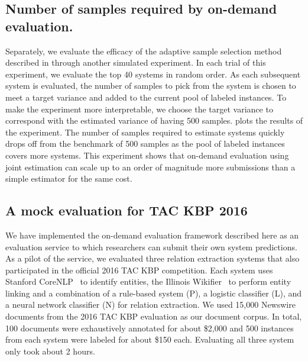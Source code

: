 \subsection{Number of samples required by on-demand evaluation.}
Separately, we evaluate the efficacy of the adaptive sample selection method described in  through another simulated experiment.
In each trial of this experiment, we evaluate the top 40 systems in random order.
As each subsequent system is evaluated, the number of samples to pick from the system is chosen to meet a target variance and added to the current pool of labeled instances.
To make the experiment more interpretable, we choose the target variance to correspond with the estimated variance of having 500 samples.
 plots the results of the experiment.
The number of samples required to estimate systems quickly drops off from the benchmark of 500 samples as the pool of labeled instances covers more systems.
This experiment shows that on-demand evaluation using joint estimation can scale up to an order of magnitude more submissions  than a simple estimator for the same cost.

\subsection{A mock evaluation for TAC KBP 2016}
We have implemented the on-demand evaluation framework described here as an evaluation service to which researchers can submit their own system predictions.
As a pilot of the service, we evaluated three relation extraction systems that also participated in the official 2016 TAC KBP competition.
Each system uses Stanford CoreNLP~\citep{manning2014stanford} to identify entities, the Illinois Wikifier~\citep{ratinov2011local} to perform entity linking and a combination of a rule-based system (P), a logistic classifier (L), and a neural network classifier (N) for relation extraction.
We used 15,000 Newswire documents from the 2016 TAC KBP evaluation as our document corpus.
In total, 100 documents were exhaustively annotated for about \$2,000 and 500 instances from each system were labeled for about \$150 each.
Evaluating all three system only took about 2 hours. 

